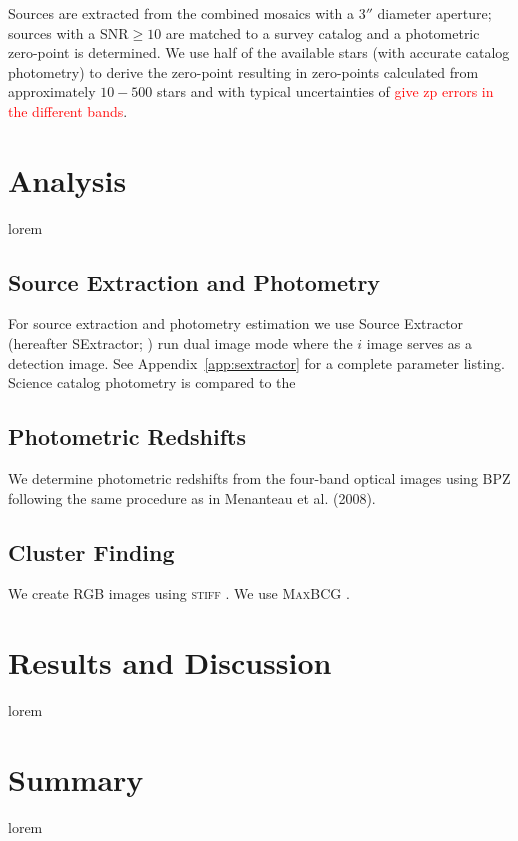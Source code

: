 \documentclass[apj, revtex4]{emulateapj}
\newcommand{\editorial}[1]{\textcolor{red}{#1}}
\begin{document}
Sources are extracted from the combined mosaics with a $3''$ diameter aperture; sources with a SNR$\ge10$ are matched to a survey catalog and a photometric zero-point is determined. We use half of the available stars (with accurate catalog photometry) to derive the zero-point resulting in zero-points calculated from approximately $10-500$ stars and with typical uncertainties of \editorial{give zp errors in the different bands}.

\section{Analysis}\label{sec:analysis}
lorem

\subsection{Source Extraction and Photometry}
For source extraction and photometry estimation we use Source Extractor (hereafter SExtractor; \citealt{Bertin1996}) run dual image mode where the $i$ image serves as a detection image. See Appendix~\ref{app:sextractor} for a complete parameter listing. Science catalog photometry is compared to the 



\subsection{Photometric Redshifts}
We determine photometric redshifts from the four-band optical images using BPZ \citep{Benitez2000} following the same
procedure as in Menanteau et al. (2008).
\subsection{Cluster Finding}
We create RGB images using \textsc{stiff} \citep{Bertin2011}.
We use \textsc{MaxBCG} \citep{Koester2007b}.

\section{Results and Discussion}\label{sec:results}

lorem

\section{Summary}\label{sec:summary}

lorem
\end{document}
